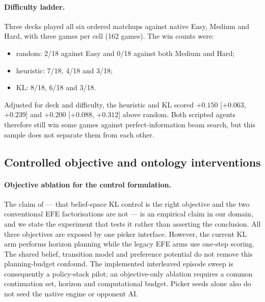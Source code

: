 \documentclass[11pt,a4paper]{article}
\theoremstyle{definition}
\theoremstyle{plain}
\begin{document}
\paragraph{Difficulty ladder.}
Three decks played all six ordered matchups against native Easy, Medium and
Hard, with three games per cell (162 games). The win counts were:
\begin{itemize}[leftmargin=1.2em, itemsep=1pt]
  \item random: 2/18 against Easy and 0/18 against both Medium and Hard;
  \item heuristic: 7/18, 4/18 and 3/18;
  \item KL: 8/18, 6/18 and 3/18.
\end{itemize}
Adjusted for deck and difficulty, the heuristic and KL scored $+0.150$
[$+0.063$, $+0.239$] and $+0.200$ [$+0.088$, $+0.312$] above random. Both
scripted agents therefore still win some games against perfect-information
beam search, but this sample does not separate them from each other.

\subsection{Controlled objective and ontology interventions}
\paragraph{Objective ablation for the control formulation.}
\label{sec:eval-aif-ablation}
The claim of  --- that belief-space KL control is the right objective and the two conventional EFE factorisations are not --- is an empirical claim in our domain, and we state the experiment that tests it rather than asserting the conclusion. All three objectives are exposed by one picker interface. However, the current KL arm performs horizon planning while the legacy EFE arms use one-step scoring. The shared belief, transition model and preference potential do not remove this planning-budget confound. The implemented interleaved episode sweep is consequently a policy-stack pilot; an objective-only ablation requires a common continuation set, horizon and computational budget. Picker seeds alone also do not seed the native engine or opponent AI.
\end{document}
